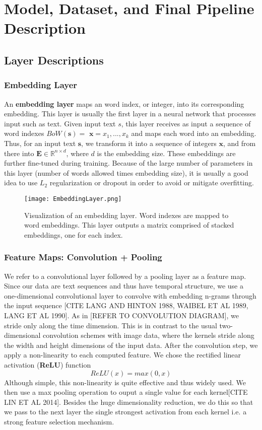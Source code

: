 
\chapter{Model, Dataset, and Final Pipeline Description}
\section{Layer Descriptions}
\subsection{Embedding Layer}
An \textbf{embedding layer} maps an word index, or integer, into its corresponding embedding.
This layer is usually the first layer in a neural network that processes input such as text.
Given input text $s$, this layer receives as input a sequence of word indexes $BoW(\bm{s})=$ $\bm{x} = x_1,...,x_k$
and maps each word into an embedding.
Thus, for an input text $\bm{s}$, we transform it into a sequence of integers $\bm{x}$, and from there into $\mathbf{E} \in \mathbb{R}^{n \times d}$, where $d$ is
the embedding size. These embeddings are further fine-tuned during training. Because of the large number of
parameters in this layer (number of words allowed times embedding size), it is usually a good idea to
use $L_2$ regularization or dropout in order to avoid or mitigate overfitting.

\begin{figure}[H]
\caption{Visualization of an embedding layer. Word indexes are mapped to word embeddings. This
layer outputs a matrix comprised of stacked embeddings, one for each index.}
\centering
\texttt{[image: EmbeddingLayer.png]}
\end{figure}

\subsection{Feature Maps: Convolution + Pooling}

We refer to a convolutional layer followed by a pooling layer as a feature map.
Since our data are text sequences and thus have temporal structure, we use a one-dimensional convolutional
layer to convolve with embedding n-grams through the input sequence [CITE LANG AND HINTON 1988, WAIBEL ET AL 1989,
LANG ET AL 1990].
As in [REFER TO CONVOLUTION DIAGRAM], we stride only along the time dimension. This is in contrast to the usual two-dimensional convolution schemes with image data,
where the kernels stride along the width and height dimensions of the input data. After the convolution step,
we apply a non-linearity to each computed feature. We chose the rectified linear activation (\textbf{ReLU}) function
\[ReLU(x) = max(0,x)\]
Although simple, this non-linearity is quite effective and thus widely used.
We then use a max pooling operation to ouput a single value for each kernel[CITE LIN ET AL 2014]. Besides the huge
dimensionality reduction, we do this so that we pass to the next layer the single strongest activation
from each kernel i.e. a strong feature selection mechanism.

